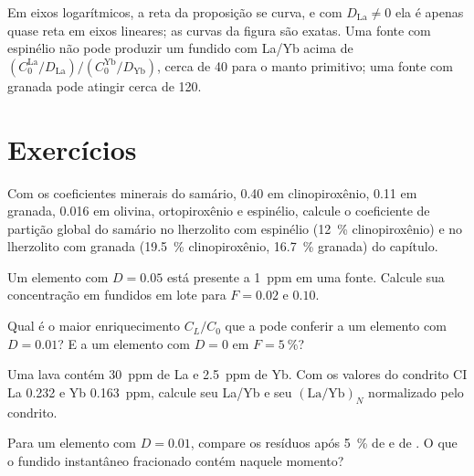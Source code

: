 Em eixos logarítmicos, a reta da proposição se curva, e com
$D_{\mathrm{La}} \ne 0$ ela é apenas quase reta em eixos lineares; as curvas
da figura são exatas. Uma fonte com espinélio não pode produzir um fundido com La/Yb acima de
$(C_0^{\mathrm{La}}/D_{\mathrm{La}})/(C_0^{\mathrm{Yb}}/D_{\mathrm{Yb}})$,
cerca de 40 para o manto primitivo; uma fonte com granada pode atingir cerca de 120.

\section{Exercícios}

\begin{exercise}[$\star$]\label{exo:b3:trace-element-modelling:1}
Com os coeficientes minerais do samário, 0.40 em clinopiroxênio, 0.11 em
granada, 0.016 em olivina, ortopiroxênio e espinélio, calcule o coeficiente de partição global
do samário no lherzolito com espinélio (\qty{12}{\percent}
clinopiroxênio) e no lherzolito com granada (\qty{19.5}{\percent} clinopiroxênio,
\qty{16.7}{\percent} granada) do capítulo.
\end{exercise}

\begin{exercise}[$\star$]\label{exo:b3:trace-element-modelling:2}
Um elemento com $D = 0.05$ está presente a \qty{1}{ppm} em uma fonte. Calcule
sua concentração em fundidos em lote para $F = 0.02$ e $0.10$.
\end{exercise}

\begin{exercise}[$\star$]\label{exo:b3:trace-element-modelling:3}
Qual é o maior enriquecimento $C_L/C_0$ que a  pode conferir a um
elemento com $D = 0.01$? E a um elemento com $D = 0$ em
$F = \qty{5}{\percent}$?
\end{exercise}

\begin{exercise}[$\star$]\label{exo:b3:trace-element-modelling:4}
Uma lava contém \qty{30}{ppm} de La e \qty{2.5}{ppm} de Yb. Com os valores do condrito CI
La 0.232 e Yb \qty{0.163}{ppm}, calcule seu La/Yb e seu
$(\mathrm{La}/\mathrm{Yb})_N$ normalizado pelo condrito.
\end{exercise}

\begin{exercise}[$\star\star$]\label{exo:b3:trace-element-modelling:5}
Para um elemento com $D = 0.01$, compare os resíduos após \qty{5}{\percent}
de  e de . O que o fundido instantâneo
fracionado contém naquele momento?
\end{exercise}

